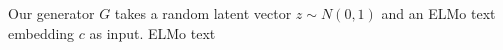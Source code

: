 Our generator $G$ takes a random latent vector $z \sim N(0, 1)$ and an ELMo text embedding $c$ as input. ELMo text 